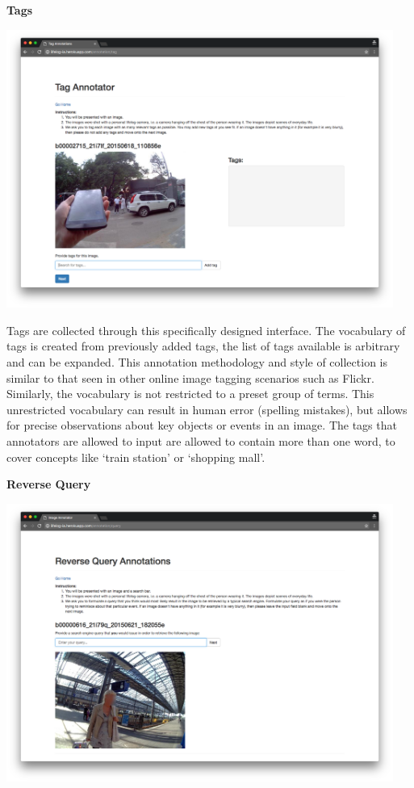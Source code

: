 \newpage
\textbf{Tags}

\includegraphics[width=0.95\textwidth]{images/tag-interface}

Tags are collected through this specifically designed interface. The vocabulary of tags is created from previously added tags, the list of tags available is arbitrary and can be expanded. This annotation methodology and style of collection is similar to that seen in other online image tagging scenarios such as Flickr. Similarly, the vocabulary is not restricted to a preset group of terms. This unrestricted vocabulary can result in human error (spelling mistakes), but allows for precise observations about key objects or events in an image. The tags that annotators are allowed to input are allowed to contain more than one word, to cover concepts like `train station' or `shopping mall'.

\newpage
\textbf{Reverse Query}

\includegraphics[width=0.95\textwidth]{images/query-interface}

